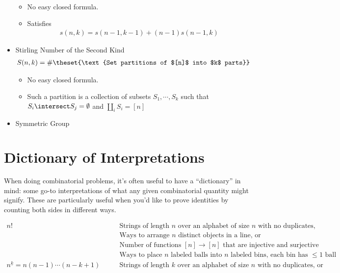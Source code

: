 \begin{itemize}
  \begin{itemize}
  \tightlist
  \item
    No easy closed formula.
  \item
    Satisfies
    \begin{align*}
    s(n, k) = s(n-1, k-1) + (n-1)s(n-1, k)
    \end{align*}
  \end{itemize}
\item
  Stirling Number of the Second Kind
  \begin{align*}
  S(n, k) = \#\theset{\text{Set partitions of $[n]$ into $k$ parts}}
  \end{align*}

  \begin{itemize}
  \tightlist
  \item
    No easy closed formula.
  \item
    Such a partition is a collection of subsets \(S_1, \cdots , S_k\)
    such that \(S_i \intersect S_j = \emptyset\) and
    \(\coprod_i S_i = [n]\)
  \end{itemize}
\item
  Symmetric Group
\end{itemize}

\hypertarget{dictionary-of-interpretations}{%
\section{Dictionary of
Interpretations}\label{dictionary-of-interpretations}}

When doing combinatorial problems, it's often useful to have a
``dictionary'' in mind: some go-to interpretations of what any given
combinatorial quantity might signify. These are particularly useful when
you'd like to prove identities by counting both sides in different ways.

\begin{align*}
n! &\qquad \text{Strings of length $n$ over an alphabet of size $n$ with no duplicates,}\\
&\qquad \text{Ways to arrange $n$ distinct objects in a line, or}\\
&\qquad \text{Number of functions $[n] \to [n]$ that are injective and surjective}\\
&\qquad \text{Ways to place $n$ labeled balls into $n$ labeled bins, each bin has $\leq 1$ ball}\\
n^{\underline k} = n(n-1)\cdots(n-k+1) &\qquad \text{Strings of length $k$ over an alphabet of size $n$ with no duplicates, or} \\
&\qquad \text{}\\
\end{align*}

